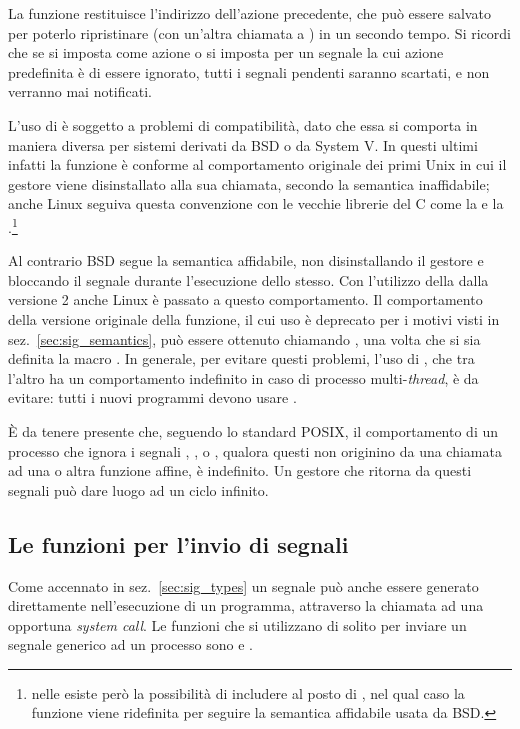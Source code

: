 La funzione restituisce l'indirizzo dell'azione precedente, che può essere
salvato per poterlo ripristinare (con un'altra chiamata a ) in un
secondo tempo. Si ricordi che se si imposta come azione  o si
imposta  per un segnale la cui azione predefinita è di essere
ignorato, tutti i segnali pendenti saranno scartati, e non verranno mai
notificati.

L'uso di  è soggetto a problemi di compatibilità, dato che essa
si comporta in maniera diversa per sistemi derivati da BSD o da System V. In
questi ultimi infatti la funzione è conforme al comportamento originale dei
primi Unix in cui il gestore viene disinstallato alla sua chiamata, secondo la
semantica inaffidabile; anche Linux seguiva questa convenzione con le vecchie
librerie del C come la  e la .\footnote{nelle
   esiste però la possibilità di includere  al
  posto di , nel qual caso la funzione  viene
  ridefinita per seguire la semantica affidabile usata da BSD.}

Al contrario BSD segue la semantica affidabile, non disinstallando il gestore
e bloccando il segnale durante l'esecuzione dello stesso. Con l'utilizzo della
 dalla versione 2 anche Linux è passato a questo comportamento.  Il
comportamento della versione originale della funzione, il cui uso è deprecato
per i motivi visti in sez.~\ref{sec:sig_semantics}, può essere ottenuto
chiamando , una volta che si sia definita la macro
.  In generale, per evitare questi problemi, l'uso di
, che tra l'altro ha un comportamento indefinito in caso di
processo multi-\textit{thread}, è da evitare: tutti i nuovi programmi devono
usare .

È da tenere presente che, seguendo lo standard POSIX, il comportamento di un
processo che ignora i segnali , , o
, qualora questi non originino da una chiamata ad una
 o altra funzione affine, è indefinito. Un gestore che ritorna da
questi segnali può dare luogo ad un ciclo infinito.


\subsection{Le funzioni per l'invio di segnali}
\label{sec:sig_kill_raise}

Come accennato in sez.~\ref{sec:sig_types} un segnale può anche essere
generato direttamente nell'esecuzione di un programma, attraverso la chiamata
ad una opportuna \textit{system call}. Le funzioni che si utilizzano di solito
per inviare un segnale generico ad un processo sono  e
.

